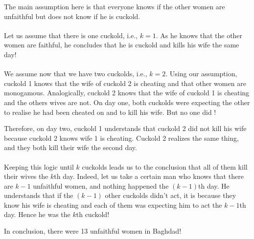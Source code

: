 The main assumption here is that everyone knows if the other women are unfaithful but does not know if he is cuckold.

\paragraph{}Let us assume that there is one cuckold, i.e., $k = 1$. As he knows that the other women are faithful, he concludes that he is cuckold and kills his wife the same day! 

\paragraph{}We assume now that we have two cuckolds, i.e., $k=2$.
Using our assumption, cuckold 1 knows that the wife of cuckold 2 is cheating and that other women are monogamous. Analogically, cuckold 2 knows that the wife of cuckold 1 is cheating and the others wives are not. On day one, both cuckolds were expecting the other to realise he had been cheated on and to kill his wife. But no one did ! 

Therefore, on day two, cuckold 1 understands that cuckold 2 did not kill his wife because cuckold 2 knows wife 1 is cheating. Cuckold 2 realizes the same thing, and they both kill their wife the second day.  

\paragraph{}Keeping this logic until $k$ cuckolds leads us to the conclusion that all of them kill their wives the $k$th day. Indeed, let us take a certain man who knows that there are $k - 1$ unfaithful women, and nothing happened the $(k-1)$th day. He understands that if the $(k-1)$ other cuckolds didn't act, it is because they know his wife is cheating and each of them was expecting him to act the $k-1$th day. Hence he was the $k$th cuckold!

In conclusion, there were 13 unfaithful women in Baghdad! 
